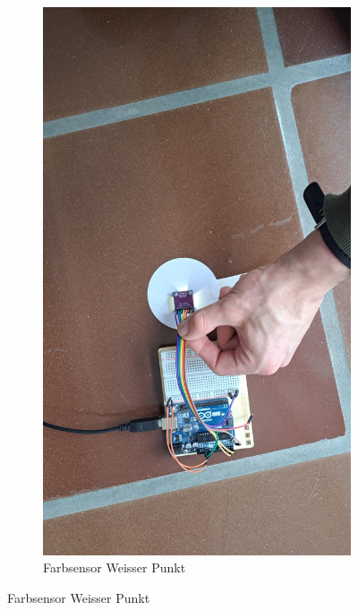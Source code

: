 \documentclass[../main.tex]{subfiles}
\begin{document}
\begin{figure}[H]
\begin{subfigure}{0.3\textwidth}
        \centering
        \includegraphics[width=\linewidth]{img/sensortest/Farbsensor_WeisserPunkt.jpg}
        \caption{Farbsensor Weisser Punkt}
        \label{fig:FarbsensorWeisserPunkt}
    \end{subfigure}
    
    \vspace{0.5cm}


\end{figure}
\end{document}
